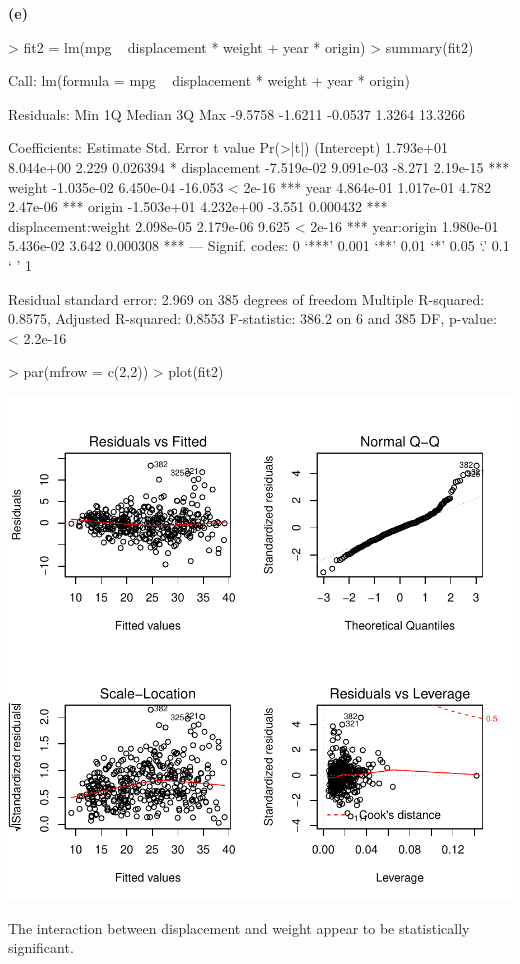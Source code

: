 \documentclass[a4paper]{article}
\renewcommand{\part}[1] {\vspace{.10in} {\bf (#1)}}
\begin{document}
\part{e}
\begin{Schunk}
\begin{Sinput}
> fit2 = lm(mpg ~ displacement * weight   + year * origin)
> summary(fit2)
\end{Sinput}
\begin{Soutput}
Call:
lm(formula = mpg ~ displacement * weight + year * origin)

Residuals:
    Min      1Q  Median      3Q     Max 
-9.5758 -1.6211 -0.0537  1.3264 13.3266 

Coefficients:
                      Estimate Std. Error t value Pr(>|t|)    
(Intercept)          1.793e+01  8.044e+00   2.229 0.026394 *  
displacement        -7.519e-02  9.091e-03  -8.271 2.19e-15 ***
weight              -1.035e-02  6.450e-04 -16.053  < 2e-16 ***
year                 4.864e-01  1.017e-01   4.782 2.47e-06 ***
origin              -1.503e+01  4.232e+00  -3.551 0.000432 ***
displacement:weight  2.098e-05  2.179e-06   9.625  < 2e-16 ***
year:origin          1.980e-01  5.436e-02   3.642 0.000308 ***
---
Signif. codes:  0 ‘***’ 0.001 ‘**’ 0.01 ‘*’ 0.05 ‘.’ 0.1 ‘ ’ 1

Residual standard error: 2.969 on 385 degrees of freedom
Multiple R-squared:  0.8575,	Adjusted R-squared:  0.8553 
F-statistic: 386.2 on 6 and 385 DF,  p-value: < 2.2e-16
\end{Soutput}
\begin{Sinput}
> par(mfrow = c(2,2))
> plot(fit2)
\end{Sinput}
\end{Schunk}
\includegraphics{mutivariblelm-9e}
\begin{enumerate}
{\color{red}
\item The interaction between displacement and weight appear to be statistically significant.
}
\end{enumerate}
\end{document}
